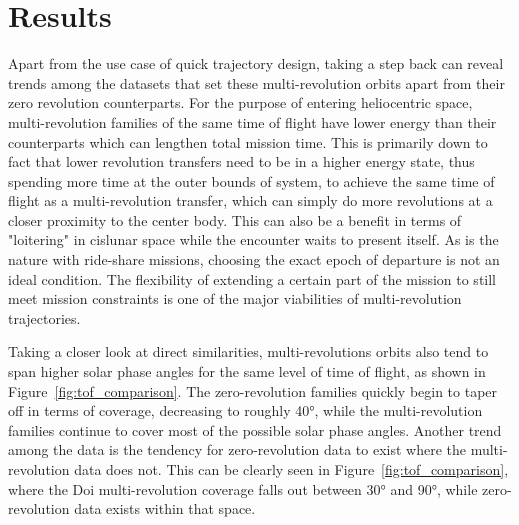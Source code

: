\documentclass[letterpaper, paper,11pt]{AAS}	%
\begin{document}
\section*{Results}

Apart from the use case of quick trajectory design, taking a step back can reveal trends among the datasets that set these multi-revolution orbits apart from their zero revolution counterparts. For the purpose of entering heliocentric space, multi-revolution families of the same time of flight have lower energy than their counterparts which can lengthen total mission time. This is primarily down to fact that lower revolution transfers need to be in a higher energy state, thus spending more time at the outer bounds of system, to achieve the same time of flight as a multi-revolution transfer, which can simply do more revolutions at a closer proximity to the center body. This can also be a benefit in terms of "loitering" in cislunar space while the encounter waits to present itself. As is the nature with ride-share missions, choosing the exact epoch of departure is not an ideal condition. The flexibility of extending a certain part of the mission to still meet mission constraints is one of the major viabilities of multi-revolution trajectories. 

Taking a closer look at direct similarities, multi-revolutions orbits also tend to span higher solar phase angles for the same level of time of flight, as shown in Figure~\ref{fig:tof_comparison}. The zero-revolution families quickly begin to taper off in terms of coverage, decreasing to roughly 40°, while the multi-revolution families continue to cover most of the possible solar phase angles. Another trend among the data is the tendency for zero-revolution data to exist where the multi-revolution data does not. This can be clearly seen in Figure~\ref{fig:tof_comparison}, where the Doi multi-revolution coverage falls out between 30° and 90°, while zero-revolution data exists within that space.  %
\end{document}
